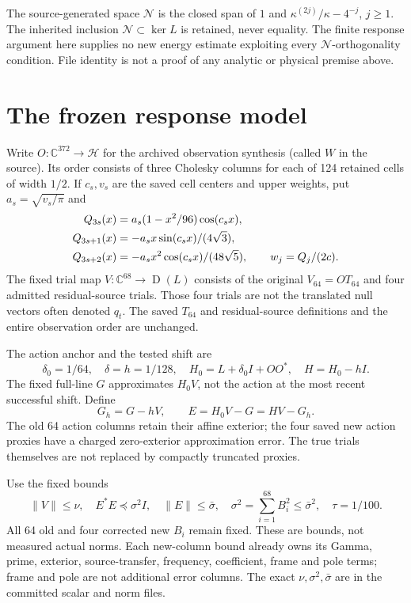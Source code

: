 \documentclass[11pt,a4paper]{article}
\newcommand{\C}{\mathbb C}
\newcommand{\HH}{\mathcal H}
\newcommand{\NN}{\mathcal N}
\newcommand{\Dom}{\operatorname{D}}
\newcommand{\norm}[1]{\lVert #1\rVert}
\theoremstyle{definition}
\theoremstyle{remark}
\numberwithin{equation}{section}
\begin{document}
The source-generated space $\NN$ is the closed span of $1$ and
$\kappa^{(2j)}/\kappa-4^{-j}$, $j\ge1$. The inherited inclusion
$\NN\subset\ker L$ is retained, never equality. The finite response
argument here supplies no new energy estimate exploiting every
$\NN$-orthogonality condition. File identity is not a proof of any
analytic or physical premise above.

\section{The frozen response model}\label{sec:model}

Write $O:\C^{372}\to\HH$ for the archived observation synthesis
(called $W$ in the source). Its order consists of three Cholesky columns
for each of 124 retained cells of width $1/2$. If $c_s,v_s$ are the saved
cell centers and upper weights, put $a_s=\sqrt{v_s/\pi}$ and
\begin{align}
 Q_{3s}(x)&=a_s(1-x^2/96)\cos(c_sx),\notag\\
 Q_{3s+1}(x)&=-a_sx\sin(c_sx)/(4\sqrt3),\notag\\
 Q_{3s+2}(x)&=-a_sx^2\cos(c_sx)/(48\sqrt5),\qquad
 w_j=Q_j/(2c).
\end{align}
The fixed trial map $V:\C^{68}\to\Dom(L)$ consists of the original
$V_{64}=OT_{64}$ and four admitted residual-source trials. Those four
trials are not the translated null vectors often denoted $q_t$.
The saved $T_{64}$ and residual-source definitions and the entire
observation order are unchanged.

The action anchor and the tested shift are
\begin{equation}\label{eq:shift}
 \delta_0=1/64,\quad \delta=h=1/128,\quad
 H_0=L+\delta_0I+OO^*,\quad H=H_0-hI.
\end{equation}
The fixed full-line $G$ approximates $H_0V$, not the action at the most
recent successful shift. Define
\begin{equation}
 G_h=G-hV,\qquad E=H_0V-G=HV-G_h.
\end{equation}
The old 64 action columns retain their affine exterior; the four saved
new action proxies have a charged zero-exterior approximation error.
The true trials themselves are not replaced by compactly truncated proxies.

Use the fixed bounds
\begin{equation}\label{eq:budgets}
 \norm V\le\nu,\quad E^*E\preceq\sigma^2I,
 \quad \norm E\le\bar\sigma,\quad
 \sigma^2=\sum_{i=1}^{68}B_i^2\le\bar\sigma^2,
 \quad \tau=1/100.
\end{equation}
All 64 old and four corrected new $B_i$ remain fixed. These are bounds,
not measured actual norms. Each new-column bound already owns its Gamma,
prime, exterior, source-transfer, frequency, coefficient, frame and pole
terms; frame and pole are not additional error columns. The exact
$\nu,\sigma^2,\bar\sigma$ are in the committed scalar and norm files.
\end{document}
